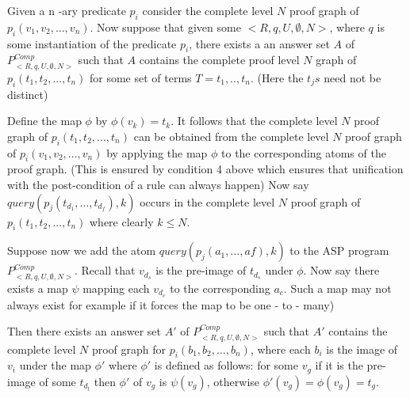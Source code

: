 \documentclass[sigconf]{acmart}
\begin{document}
Given a n -ary predicate $p_{i}$ consider the complete level $N$ proof graph of $p_{i}(v_{1},v_{2},...,v_{n})$. Now suppose that given some $<R,q,U,\emptyset,N>$, where $q$ is some instantiation of the predicate $p_{i}$, there exists a an answer set $A$ of $P_{<R,q,U,\emptyset,N>}^{Comp}$ such that $A$ contains the complete proof level $N$ graph of $p_{i}(t_{1},t_{2},...,t_{n})$ for some set of terms  $T = t_{1},..,t_{n}$. (Here the $t_{j}s$ need not be distinct)

Define the map $\phi$ by $\phi(v_{k})= t_{k}$. It follows that the complete level $N$ proof graph  of $p_{i}(t_{1},t_{2},...,t_{n})$ can be obtained from the complete level $N$ proof graph of $p_{i}(v_{1},v_{2},...,v_{n})$ by applying the map $\phi$ to the corresponding atoms of the proof graph. (This is ensured by condition 4 above which ensures that unification with the post-condition of a rule can always happen) Now say $query(p_{j}(t_{d_{1}},...,t_{d_{f}}),k)$ occurs in the complete level $N$ proof graph of $p_{i}(t_{1},t_{2},...,t_{n})$ where clearly $k\leq N$.

Suppose now we add the atom $query(p_{j}(a_{1},...,a{f}),k)$ to the ASP program $P_{<R,q,U,\emptyset,N>}^{Comp}$. Recall that $v_{d_{s}}$ is the pre-image of $t_{d_{s}}$ under $\phi$. Now say there exists a map $\psi$ mapping each $v_{d_{c}}$ to the corresponding $a_{c}$. Such a map may not always exist for example if it forces the map to be one - to - many)

Then there exists an answer set $A'$ of $P_{<R,q,U,\emptyset,N>}^{Comp}$ such that $A'$ contains the complete level $N$ proof graph for $p_{i}(b_{1},b_{2},...,b_{n})$, where each $b_{i}$ is the image of $v_{i}$ under the map $\phi'$ where $\phi'$ is defined as follows: for some $v_{g}$ if it is the pre-image of some $t_{d_{l}}$ then $\phi'$ of $v_{g}$ is $\psi(v_{g})$, otherwise $\phi'(v_{g}) = \phi(v_{g})= t_{g}$.
\end{document}
